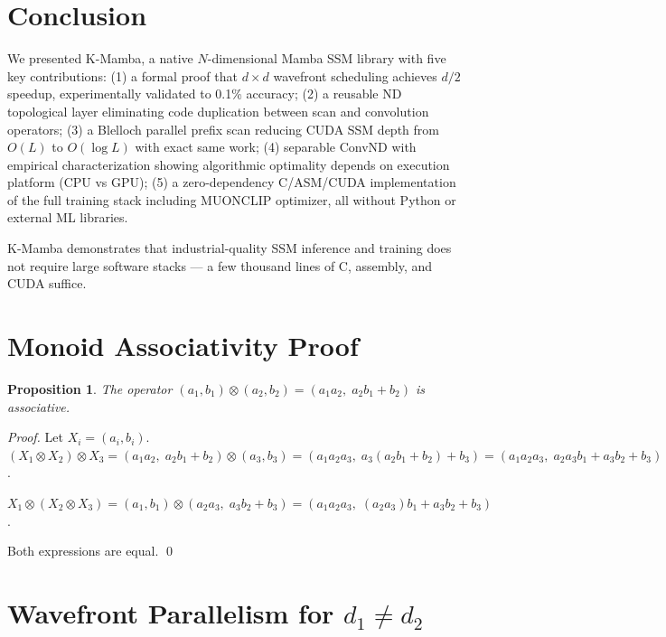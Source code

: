 \documentclass[10pt,onecolumn]{article}
\newtheorem{proposition}{Proposition}
\begin{document}
\section{Conclusion}

We presented K-Mamba, a native $N$-dimensional Mamba SSM library
with five key contributions: (1) a formal proof that $d \times d$
wavefront scheduling achieves $d/2$ speedup, experimentally validated
to 0.1\% accuracy; (2) a reusable ND topological layer eliminating code
duplication between scan and convolution operators; (3) a Blelloch parallel
prefix scan reducing CUDA SSM depth from $O(L)$ to $O(\log L)$ with exact
same work; (4) separable ConvND with empirical characterization showing
algorithmic optimality depends on execution platform (CPU vs GPU);
(5) a zero-dependency C/ASM/CUDA implementation of the full
training stack including MUONCLIP optimizer, all without Python or external
ML libraries.

K-Mamba demonstrates that industrial-quality SSM inference and training
does not require large software stacks —
a few thousand lines of C, assembly, and CUDA suffice.

\appendix
\section{Monoid Associativity Proof}
\label{app:monoid}

\begin{proposition}
The operator $(a_1,b_1) \otimes (a_2,b_2) = (a_1 a_2,\; a_2 b_1 + b_2)$
is associative.
\end{proposition}

\begin{proof}
Let $X_i = (a_i, b_i)$.
$(X_1 \otimes X_2) \otimes X_3
= (a_1 a_2,\; a_2 b_1 + b_2) \otimes (a_3, b_3)
= (a_1 a_2 a_3,\; a_3(a_2 b_1 + b_2) + b_3)
= (a_1 a_2 a_3,\; a_2 a_3 b_1 + a_3 b_2 + b_3)$.

$X_1 \otimes (X_2 \otimes X_3)
= (a_1, b_1) \otimes (a_2 a_3,\; a_3 b_2 + b_3)
= (a_1 a_2 a_3,\; (a_2 a_3) b_1 + a_3 b_2 + b_3)$.

Both expressions are equal. \qed
\end{proof}

\section{Wavefront Parallelism for $d_1 \neq d_2$}
\label{app:wavefront_rect}
\end{document}
